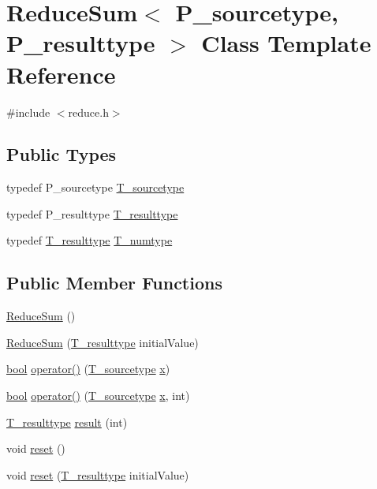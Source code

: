 \hypertarget{classReduceSum}{}\section{Reduce\+Sum$<$ P\+\_\+sourcetype, P\+\_\+resulttype $>$ Class Template Reference}
\label{classReduceSum}


{\ttfamily \#include $<$reduce.\+h$>$}

\subsection*{Public Types}
\begin{DoxyCompactItemize}
\item 
typedef P\+\_\+sourcetype \hyperlink{classReduceSum_a7b69b4723eb1e1087ffad91f8573beb6}{T\+\_\+sourcetype}
\item 
typedef P\+\_\+resulttype \hyperlink{classReduceSum_a2d3d58d67dfb475db90aad9fe0c66bf1}{T\+\_\+resulttype}
\item 
typedef \hyperlink{classReduceSum_a2d3d58d67dfb475db90aad9fe0c66bf1}{T\+\_\+resulttype} \hyperlink{classReduceSum_a0e862930f1f359e5d61b56501ad4a9b7}{T\+\_\+numtype}
\end{DoxyCompactItemize}
\subsection*{Public Member Functions}
\begin{DoxyCompactItemize}
\item 
\hyperlink{classReduceSum_ae27d9a857e8f419be2c8bdf6fca0f6a3}{Reduce\+Sum} ()
\item 
\hyperlink{classReduceSum_a3ee3453a110db44af63531f04c507f38}{Reduce\+Sum} (\hyperlink{classReduceSum_a2d3d58d67dfb475db90aad9fe0c66bf1}{T\+\_\+resulttype} initial\+Value)
\item 
\hyperlink{compiler_8h_abb452686968e48b67397da5f97445f5b}{bool} \hyperlink{classReduceSum_a1633e0dfc21ddc2bb666fcdd8d19cc2f}{operator()} (\hyperlink{classReduceSum_a7b69b4723eb1e1087ffad91f8573beb6}{T\+\_\+sourcetype} \hyperlink{vecnorm1_8cc_ac73eed9e41ec09d58f112f06c2d6cb63}{x})
\item 
\hyperlink{compiler_8h_abb452686968e48b67397da5f97445f5b}{bool} \hyperlink{classReduceSum_a9da03bd12193e84de5b4fc75306b9e4f}{operator()} (\hyperlink{classReduceSum_a7b69b4723eb1e1087ffad91f8573beb6}{T\+\_\+sourcetype} \hyperlink{vecnorm1_8cc_ac73eed9e41ec09d58f112f06c2d6cb63}{x}, int)
\item 
\hyperlink{classReduceSum_a2d3d58d67dfb475db90aad9fe0c66bf1}{T\+\_\+resulttype} \hyperlink{classReduceSum_a571f0774ab9a71ef8bd725df7c6ba7ad}{result} (int)
\item 
void \hyperlink{classReduceSum_a02a07fb42d0402e67cc35a246722c460}{reset} ()
\item 
void \hyperlink{classReduceSum_a87c7a46bdefea003710bfbbb9f6dd77a}{reset} (\hyperlink{classReduceSum_a2d3d58d67dfb475db90aad9fe0c66bf1}{T\+\_\+resulttype} initial\+Value)
\end{DoxyCompactItemize}
